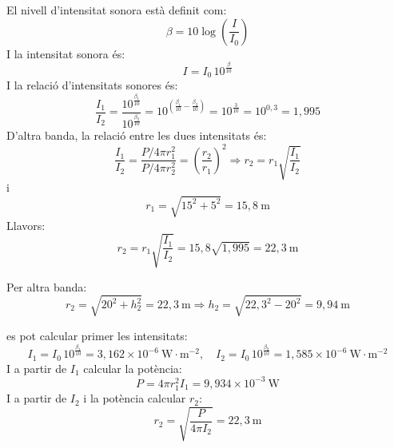 \begin{solapartat}
 El nivell d'intensitat sonora està definit com:
\[ \beta = 10\log\left(\frac{I}{I_0}\right) \]
I la intensitat sonora és:
\[ I = I_0\,10^{\frac{\beta}{10}} \]
I la relació d'intensitats sonores és:
\[ \frac{I_1}{I_2} = \frac{10^{\frac{\beta_1}{10}}}{10^{\frac{\beta_2}{10}}} = 10^{\left(\frac{\beta_1}{10} - \frac{\beta_2}{10}\right)} = 10^{\frac{3}{10}} = 10^{0,3} = 1,995 \]
D'altra banda, la relació entre les dues intensitats és:
\[ \frac{I_1}{I_2} = \frac{P/4\pi r_1^2}{P/4\pi r_2^2} = \left(\frac{r_2}{r_1}\right)^2 \Longrightarrow r_2 = r_1\sqrt{\frac{I_1}{I_2}} \]
i
\[ r_1 = \sqrt{15^2 + 5^2} = 15,8\ \mathrm{m} \]
Llavors:
\[ r_2 = r_1\sqrt{\frac{I_1}{I_2}} = 15,8\sqrt{1,995} = 22,3\ \mathrm{m} \]

 Per altra banda:
\[ r_2 = \sqrt{20^2 + h_2^2} = 22,3\ \mathrm{m} \Longrightarrow h_2 = \sqrt{22,3^2 - 20^2} = 9,94\ \mathrm{m} \]


 es pot calcular primer les intensitats:
\[ I_1 = I_0\,10^{\frac{\beta_1}{10}} = 3,162\times 10^{-6}\ \mathrm{W{\cdot}m^{-2}},\quad I_2 = I_0\,10^{\frac{\beta_2}{10}} = 1,585\times 10^{-6}\ \mathrm{W{\cdot}m^{-2}} \]
 I a partir de $I_1$ calcular la potència:
\[ P = 4\pi r_1^2 I_1 = 9,934\times 10^{-3}\ \mathrm{W} \]
 I a partir de $I_2$ i la potència calcular $r_2$:
\[ r_2 = \sqrt{\frac{P}{4\pi I_2}} = 22,3\ \mathrm{m} \]
\end{solapartat}

